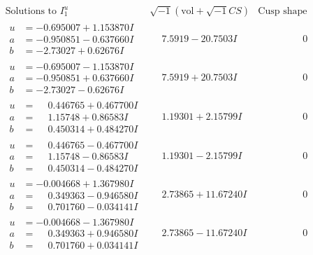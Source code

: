 \documentclass[1p]{elsarticle_modified}
\theoremstyle{definition}
\newcommand{\I}{\sqrt{-1}}
\begin{document}
$$\begin{array}{c|c|c}
\text{Solutions to }I^u_{1}& \I (\text{vol} + \sqrt{-1}CS) & \text{Cusp shape}\\
 \hline 
\begin{aligned}
u &= -0.695007 + 1.153870 I \\
a &= -0.950851 - 0.637660 I \\
b &= -2.73027 + 0.62676 I\end{aligned}
 & \phantom{-}7.5919 - 20.7503 I & \phantom{-0.000000 } 0 \\ \hline\begin{aligned}
u &= -0.695007 - 1.153870 I \\
a &= -0.950851 + 0.637660 I \\
b &= -2.73027 - 0.62676 I\end{aligned}
 & \phantom{-}7.5919 + 20.7503 I & \phantom{-0.000000 } 0 \\ \hline\begin{aligned}
u &= \phantom{-}0.446765 + 0.467700 I \\
a &= \phantom{-}1.15748 + 0.86583 I \\
b &= \phantom{-}0.450314 + 0.484270 I\end{aligned}
 & \phantom{-}1.19301 + 2.15799 I & \phantom{-0.000000 } 0 \\ \hline\begin{aligned}
u &= \phantom{-}0.446765 - 0.467700 I \\
a &= \phantom{-}1.15748 - 0.86583 I \\
b &= \phantom{-}0.450314 - 0.484270 I\end{aligned}
 & \phantom{-}1.19301 - 2.15799 I & \phantom{-0.000000 } 0 \\ \hline\begin{aligned}
u &= -0.004668 + 1.367980 I \\
a &= \phantom{-}0.349363 - 0.946580 I \\
b &= \phantom{-}0.701760 - 0.034141 I\end{aligned}
 & \phantom{-}2.73865 + 11.67240 I & \phantom{-0.000000 } 0 \\ \hline\begin{aligned}
u &= -0.004668 - 1.367980 I \\
a &= \phantom{-}0.349363 + 0.946580 I \\
b &= \phantom{-}0.701760 + 0.034141 I\end{aligned}
 & \phantom{-}2.73865 - 11.67240 I & \phantom{-0.000000 } 0 \\ \hline\begin{aligned}

\end{aligned}
\end{array}$$
\end{document}
